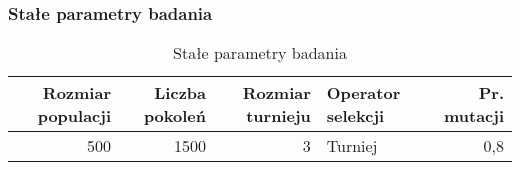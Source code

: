 \documentclass[12pt,a4paper]{article}
\begin{document}
\subsubsection{Stałe parametry badania}
\begin{table}[htbp]
  \centering
    \begin{tabular}{rrrlr}
    \multicolumn{1}{p{4.215em}}{\textbf{Rozmiar populacji}} & \multicolumn{1}{p{4.215em}}{\textbf{Liczba pokoleń}} & \multicolumn{1}{p{4.215em}}{\textbf{Rozmiar turnieju}} & \multicolumn{1}{p{4.215em}}{\textbf{Operator selekcji}} & \multicolumn{1}{p{4.215em}}{\textbf{Pr. mutacji}} \\
    \midrule
    500   & 1500  & 3     & Turniej & 0,8 \\
    \end{tabular}%
  \caption{Stałe parametry badania}
  \label{tab:addlabel}%
\end{table}%
\end{document}
